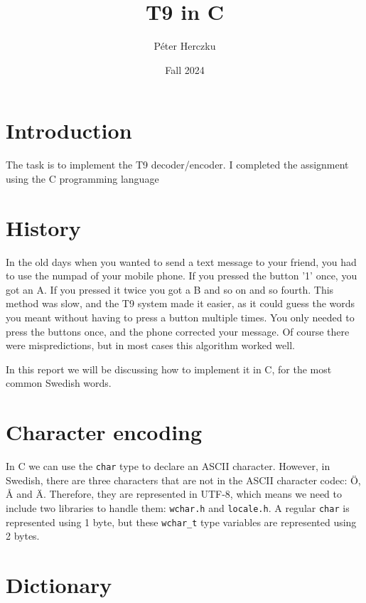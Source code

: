 \documentclass[a4paper,11pt]{article}
\begin{document}
    \title{
        \textbf{T9 in C}
    }
    \author{Péter Herczku}
    \date{Fall 2024}

    \maketitle

    \section*{Introduction}

    The task is to implement the T9 decoder/encoder.
    I completed the assignment using the C programming language

    \section*{History}

    In the old days when you wanted to send a text message to your friend, you had to use the numpad of your mobile phone.
    If you pressed the button '1' once, you got an A. 
    If you pressed it twice you got a B and so on and so fourth.
    This method was slow, and the T9 system made it easier, as it could guess the words you meant without having to press a button multiple times.
    You only needed to press the buttons once, and the phone corrected your message.
    Of course there were mispredictions, but in most cases this algorithm worked well.

    In this report we will be discussing how to implement it in C, for the most common Swedish words.

    \section*{Character encoding}

    In C we can use the {\tt char} type to declare an ASCII character.
    However, in Swedish, there are three characters that are not in the ASCII character codec: Ö, Å and Ä.
    Therefore, they are represented in UTF-8, which means we need to include two libraries to handle them: {\tt wchar.h} and {\tt locale.h}.
    A regular {\tt char} is represented using 1 byte, but these {\tt wchar\_t} type variables are represented using 2 bytes.

    \section*{Dictionary}
\end{document}
